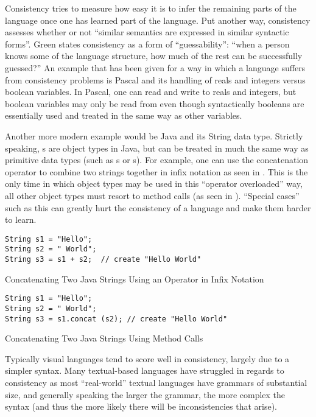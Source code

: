 Consistency tries to measure how easy it is to infer the remaining parts of the language once one has learned part of the language.  Put another way, consistency assesses whether or not ``similar semantics are expressed in similar syntactic forms''.\cite{green98}  Green states consistency as a form of ``guessability'': ``when a person knows some of the language structure, how much of the rest can be successfully guessed?''\cite{green96}  An example that has been given for a way in which a language suffers from consistency problems is Pascal and its handling of reals and integers versus boolean variables.  In Pascal, one can read and write to reals and integers, but boolean variables may only be read from even though syntactically booleans are essentially used and treated in the same way as other variables.

Another more modern example would be Java and its String data type.  Strictly speaking, s are object types in Java, but can be treated in much the same way as primitive data types (such as s or s).  For example, one can use the concatenation operator to combine two strings together in infix notation as seen in .  This is the only time in which object types may be used in this ``operator overloaded'' way, all other object types must resort to method calls (as seen in ).  ``Special cases'' such as this can greatly hurt the consistency of a language and make them harder to learn.

\begin{program}
\begin{verbatim}
String s1 = "Hello";
String s2 = " World";
String s3 = s1 + s2;  // create "Hello World" 
\end{verbatim}
\caption{Concatenating Two Java Strings Using an Operator in Infix Notation}
\label{prog:javainfix}
\end{program}

\begin{program}
\begin{verbatim}
String s1 = "Hello";
String s2 = " World";
String s3 = s1.concat (s2); // create "Hello World" 
\end{verbatim}
\caption{Concatenating Two Java Strings Using Method Calls}
\label{prog:javamethod}
\end{program}

Typically visual languages tend to score well in consistency, largely due to a simpler syntax.  Many textual-based languages have struggled in regards to consistency as most ``real-world'' textual languages have grammars of substantial size, and generally speaking the larger the grammar, the more complex the syntax (and thus the more likely there will be inconsistencies that arise).
 
